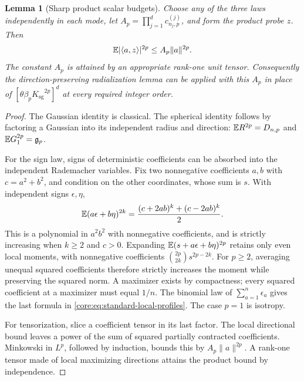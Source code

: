 \documentclass[11pt,a4paper]{article}
\newtheorem{lemma}[theorem]{Lemma}
\theoremstyle{definition}\newtheorem{definition}[theorem]{Definition}
\theoremstyle{remark}\newtheorem{remark}[theorem]{Remark}
\numberwithin{equation}{section}
\newcommand{\Ksg}{{K_{\mathrm{sg}}}}\newcommand{\Cfour}{{C_4}}
\newcommand{\gmom}{\mathfrak g}
\newcommand{\norm}[1]{\lVert#1\rVert}\newcommand{\ip}[2]{\langle#1,#2\rangle}
\begin{document}
\begin{lemma}[Sharp product scalar budgets]
\label{core:lem:standard-product-profiles}
Choose any of the three laws independently in each mode, let
$A_p=\prod_{j=1}^d c_{n_j,p}^{(j)}$, and form the product probe $z$.
Then
\[
 \E|\ip a z|^{2p}\le A_p\norm a^{2p}.
\]
The constant $A_p$ is attained by an appropriate rank-one unit tensor.
Consequently the direction-preserving radialization lemma can be
applied with this $A_p$ in place of
$[\theta\beta_p\Ksg^{2p}]^d$ at every required integer order.
\end{lemma}
\begin{proof}
The Gaussian identity is classical. The spherical identity follows by
factoring a Gaussian into its independent radius and direction:
$\mathbb E R^{2p}=D_{n,p}$ and $\E G_1^{2p}=\gmom_p$.

For the sign law, signs of deterministic coefficients can be absorbed
into the independent Rademacher variables. Fix two nonnegative
coefficients $a,b$ with $c=a^2+b^2$, and condition on the other
coordinates, whose sum is $s$. With independent signs $\epsilon,\eta$,
\[
 \mathbb E(a\epsilon+b\eta)^{2k}
 =\frac{(c+2ab)^k+(c-2ab)^k}{2}.
\]
This is a polynomial in $a^2b^2$ with nonnegative coefficients, and
is strictly increasing when $k\ge2$ and $c>0$.
Expanding $\mathbb E(s+a\epsilon+b\eta)^{2p}$ retains only even local
moments, with nonnegative coefficients
$\binom{2p}{2k}s^{2p-2k}$.
For $p\ge2$, averaging unequal squared coefficients therefore strictly
increases the moment while preserving the squared norm. A maximizer
exists by compactness; every squared coefficient at a maximizer must
equal $1/n$. The binomial law of $\sum_{a=1}^n\epsilon_a$ gives the
last formula in \eqref{core:eq:standard-local-profiles}.
The case $p=1$ is isotropy.

For tensorization, slice a coefficient tensor in its last factor.
The local directional bound leaves a power of the sum of squared
partially contracted coefficients. Minkowski in $L^p$, followed by
induction, bounds this by $A_p\norm a^{2p}$.
A rank-one tensor made of local maximizing directions attains the
product bound by independence.
\end{proof}
\end{document}
